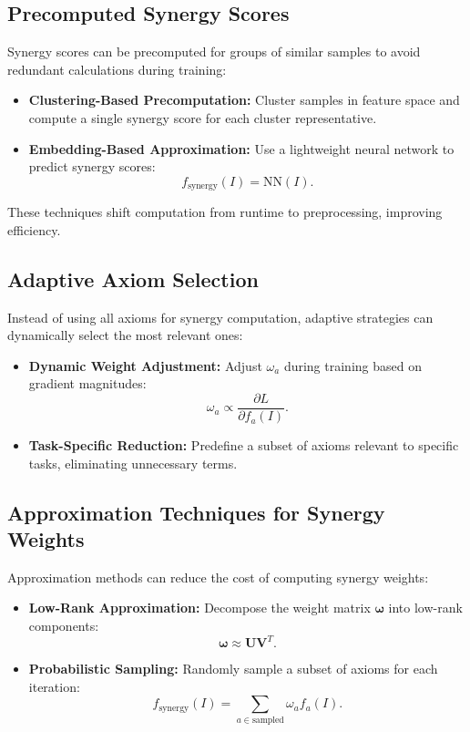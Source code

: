 \subsection{Precomputed Synergy Scores}
Synergy scores can be precomputed for groups of similar samples to avoid redundant calculations during training:
\begin{itemize}
    \item \textbf{Clustering-Based Precomputation:} Cluster samples in feature space and compute a single synergy score for each cluster representative.
    \item \textbf{Embedding-Based Approximation:} Use a lightweight neural network to predict synergy scores:
    \[
    f_{\text{synergy}}(I) = \text{NN}(I).
    \]
\end{itemize}
These techniques shift computation from runtime to preprocessing, improving efficiency.

\subsection{Adaptive Axiom Selection}
Instead of using all axioms for synergy computation, adaptive strategies can dynamically select the most relevant ones:
\begin{itemize}
    \item \textbf{Dynamic Weight Adjustment:} Adjust \(\omega_a\) during training based on gradient magnitudes:
    \[
    \omega_a \propto \frac{\partial L}{\partial f_a(I)}.
    \]
    \item \textbf{Task-Specific Reduction:} Predefine a subset of axioms relevant to specific tasks, eliminating unnecessary terms.
\end{itemize}

\subsection{Approximation Techniques for Synergy Weights}
Approximation methods can reduce the cost of computing synergy weights:
\begin{itemize}
    \item \textbf{Low-Rank Approximation:} Decompose the weight matrix \(\mathbf{\omega}\) into low-rank components:
    \[
    \mathbf{\omega} \approx \mathbf{U} \mathbf{V}^T.
    \]
    \item \textbf{Probabilistic Sampling:} Randomly sample a subset of axioms for each iteration:
    \[
    f_{\text{synergy}}(I) = \sum_{a \in \text{sampled}} \omega_a f_a(I).
    \]
\end{itemize}


